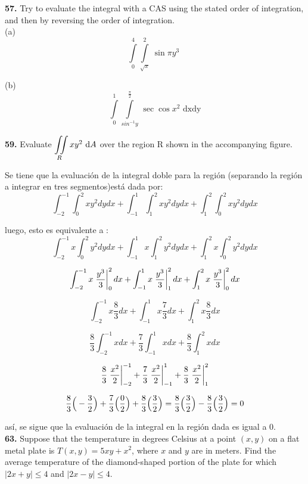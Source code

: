 \documentclass[11pt]{report}
\begin{document}
\textbf{57.} Try to evaluate the integral with a CAS using the stated order of
integration, and then by reversing the order of integration.\\

(a) \[\displaystyle \int \limits_0^4 \int \limits_{\sqrt{x}}^2 \, \sin{\pi y^3} \, \,  \]

(b) \[\displaystyle \int \limits_0^1 \int \limits_{sin^{-1}y}^{\frac{\pi}{2}}  \, \sec{\cos{x}}^2 \, \, \text{dx} \text{dy} \]

\textbf{59.} Evaluate $ {\displaystyle \iint \limits_R } \, xy^2 \, \, \text dA $ over
the region R shown in the accompanying figure. \\
\begin{figure}[h]
\centering
\end{figure}

Se tiene que la evaluación de la integral doble para la región (separando la
región a integrar en tres segmentos)está dada por:
	$$ \int_{-2}^{-1}\int_{0}^{2} xy^2 dydx +
	   \int_{-1}^{1}\int_{1}^{2} xy^2 dydx +
	   \int_{1}^{2}\int_{0}^{2} xy^2 dydx $$

luego, esto es equivalente a :
	$$ \int_{-2}^{-1} x \int_{0}^{2} y^2 dydx +
		\int_{-1}^{1} x \int_{1}^{2} y^2 dydx +
		\int_{1}^{2} x \int_{0}^{2} y^2 dydx $$

	$$ \int_{-2}^{-1} x \left.\frac{y^3}{3}\right\rvert_{0}^{2} dx +
		\int_{-1}^{1} x \left.\frac{y^3}{3}\right\rvert_{1}^{2} dx +
		\int_{1}^{2} x \left.\frac{y^3}{3}\right\rvert_{0}^{2} dx $$

	$$ \int_{-2}^{-1} x \frac{8}{3} dx +
		\int_{-1}^{1} x \frac{7}{3} dx +
		\int_{1}^{2} x \frac{8}{3} dx $$

	$$  \frac{8}{3} \int_{-2}^{-1} x dx +
		\frac{7}{3} \int_{-1}^{1} x  dx +
		\frac{8}{3} \int_{1}^{2} x  dx $$

	$$  \frac{8}{3} \left.\frac{x^2}{2}\right\rvert_{-2}^{-1} +
		\frac{7}{3} \left.\frac{x^2}{2}\right\rvert_{-1}^{1} +
		\frac{8}{3} \left.\frac{x^2}{2}\right\rvert_{1}^{2} $$

	$$  \frac{8}{3} \Big( - \frac{3}{2} \Big) +
		\frac{7}{3} \Big( \frac{0}{2} \Big) +
		\frac{8}{3} \Big( \frac{3}{2} \Big) =
		\frac{8}{3} \Big( \frac{3}{2} \Big) - \frac{8}{3} \Big( \frac{3}{2} \Big) = 0 $$

así, se sigue que la evaluación de la integral en la región dada es igual a $0$.\\

\textbf{63.} Suppose that the temperature in degrees Celsius at a point $(x, y)$
on a flat metal plate is $T(x, y) = 5xy + x^2 $, where $x$ and $y$ are in meters.
Find the average temperature of the diamond-shaped portion of the plate for which
$|2x + y| \leq 4$ and $|2x - y| \leq 4$. \\
\end{document}
